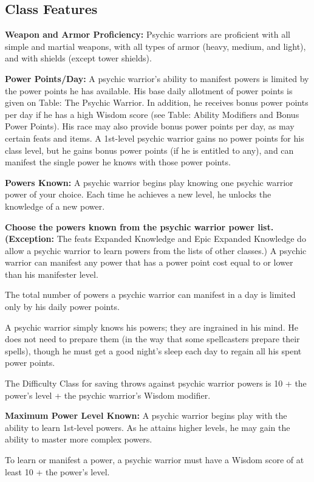 \subsection{Class Features}

\textbf{Weapon and Armor Proficiency:} Psychic warriors are proficient with all simple and martial weapons, with all types of armor (heavy, medium, and light), and with shields (except tower shields).

\textbf{Power Points/Day:} A psychic warrior’s ability to manifest powers is limited by the power points he has available. His base daily allotment of power points is given on Table: The Psychic Warrior. In addition, he receives bonus power points per day if he has a high Wisdom score (see Table: Ability Modifiers and Bonus Power Points). His race may also provide bonus power points per day, as may certain feats and items. A 1st-level psychic warrior gains no power points for his class level, but he gains bonus power points (if he is entitled to any), and can manifest the single power he knows with those power points.

\textbf{Powers Known:} A psychic warrior begins play knowing one psychic warrior power of your choice. Each time he achieves a new level, he unlocks the knowledge of a new power.

\textbf{Choose the powers known from the psychic warrior power list. (Exception:} The feats Expanded Knowledge and Epic Expanded Knowledge do allow a psychic warrior to learn powers from the lists of other classes.) A psychic warrior can manifest any power that has a power point cost equal to or lower than his manifester level.

The total number of powers a psychic warrior can manifest in a day is limited only by his daily power points.

A psychic warrior simply knows his powers; they are ingrained in his mind. He does not need to prepare them (in the way that some spellcasters prepare their spells), though he must get a good night’s sleep each day to regain all his spent power points.

The Difficulty Class for saving throws against psychic warrior powers is 10 + the power’s level + the psychic warrior’s Wisdom modifier.

\textbf{Maximum Power Level Known:} A psychic warrior begins play with the ability to learn 1st-level powers. As he attains higher levels, he may gain the ability to master more complex powers.

To learn or manifest a power, a psychic warrior must have a Wisdom score of at least 10 + the power’s level.

